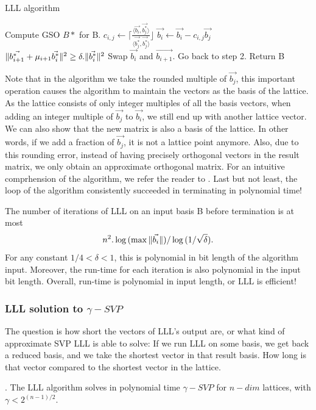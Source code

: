 \begin{algorithm}
  \caption{LLL algorithm}
  \label{alg:LLL}
  \begin{algorithmic}[1]
     \State Compute GSO $B*$ for B.  
     \State
    $c_{i,j} \gets \lceil{\frac{\langle \vec{b_i}, \vec{b_j^*} \rangle}{\langle
        \vec{b_j^*},\vec{b_j^*}\rangle}}\rfloor$ \State
    $\vec{b_i} \gets \vec{b_i} - c_{i,j}\vec{b_j}$ \EndFor \EndFor \If
    {$\Vert \vec{b_{i+1}^*}+\mu_{i+1}\vec{b_i^*} \Vert^2 \geq \delta
      . \Vert \vec{b_i^*} \Vert^2$} \State Swap $\vec{b_i}$ and $\vec{b_{i+1}}$.
    \State Go back to step 2.  \Else \State Return B \EndIf \EndProcedure
  \end{algorithmic}
\end{algorithm}
Note that in the algorithm we take the rounded multiple of $\vec{b_j}$, this
important operation causes the algorithm to maintain the vectors as the basis of
the lattice. As the lattice consists of only integer multiples of all the basis
vectors, when adding an integer multiple of $\vec{b_j}$ to $\vec{b_i}$, we still
end up with another lattice vector. We can also show that the new matrix is also
a basis of the lattice. In other words, if we add a fraction of $\vec{b_j}$, it is
not a lattice point anymore. Also, due to this rounding error, instead of having 
precisely orthogonal vectors in the result matrix, we only obtain an approximate
orthogonal matrix. For an intuitive comprhension of the algorithm, we refer the reader to
\cite{lenstra1982factoring}. Last but not least, the loop of the algorithm consistently succeeded in terminating in polynomial time!
\begin{theorem}
   The number of iterations of LLL on an input basis B before
  termination is at most
  \[
    n^2.\log{(\max{\Vert \vec{b_i} \Vert})} / \log{(1/\sqrt{\delta})}.
  \]
  For any constant $1/4 < \delta < 1$, this is polynomial in bit length of the
  algorithm input. Moreover, the run-time for each iteration is also polynomial
  in the input bit length. Overall, run-time is polynomial in input length, or
  LLL is efficient!
  \label{theo:LLLRunTime}
\end{theorem}

\subsubsection{LLL solution to $\gamma-SVP$}
\label{sec:LLLsolution}
The question is how short the vectors of LLL's output are, or what kind of
approximate SVP LLL is able to solve: If we run LLL on some basis, we get back a
reduced basis, and we take the shortest vector in that result basis. How long is
that vector compared to the shortest vector in the lattice.
\begin{theorem}
  . The LLL algorithm solves in polynomial time
  $\gamma-SVP$ for $n-dim$ lattices, with $\gamma < 2^{(n-1)/2}$.
  \label{theo:LLLShortVector}
\end{theorem}

